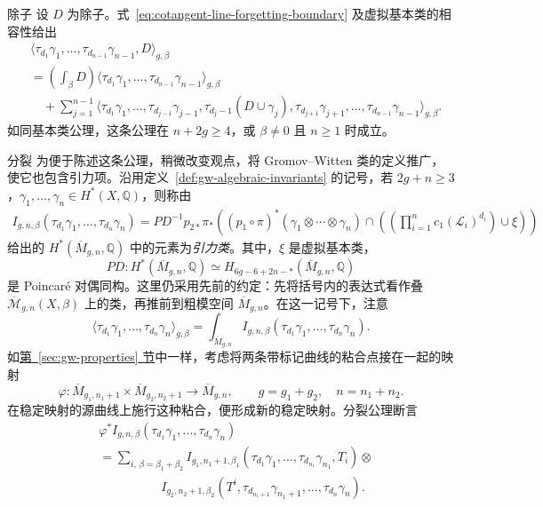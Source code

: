 \begin{axiom*}{除子}
设 $D$ 为除子。式~\eqref{eq:cotangent-line-forgetting-boundary} 及虚拟基本类的相容性给出
\[
\begin{aligned}
&\langle\tau_{d_1}\gamma_1,\ldots,\tau_{d_{n-1}}\gamma_{n-1},D\rangle_{g,\beta}\\
&=\left(\int_\beta D\right)
\langle\tau_{d_1}\gamma_1,\ldots,\tau_{d_{n-1}}\gamma_{n-1}\rangle_{g,\beta}\\
&\quad+\sum_{j=1}^{n-1}\langle\tau_{d_1}\gamma_1,\ldots,
\tau_{d_{j-1}}\gamma_{j-1},\tau_{d_j-1}(D\cup\gamma_j),
\tau_{d_{j+1}}\gamma_{j+1},\ldots,\tau_{d_{n-1}}\gamma_{n-1}\rangle_{g,\beta}.
\end{aligned}
\]
如同基本类公理，这条公理在 $n+2g\ge4$，或 $\beta\ne0$ 且 $n\ge1$ 时成立。
\end{axiom*}

\begin{axiom*}{分裂}
为便于陈述这条公理，稍微改变观点，将 Gromov--Witten 类的定义推广，使它也包含引力项。沿用定义~\ref{def:gw-algebraic-invariants} 的记号，若 $2g+n\ge3$，$\gamma_1,\ldots,\gamma_n\in H^*(X,\mathbb Q)$，则称由
\begin{equation}\label{eq:gravitational-class-definition}
\begin{aligned}
I_{g,n,\beta}(\tau_{d_1}\gamma_1,\ldots,\tau_{d_n}\gamma_n)
=PD^{-1}p_{2*}\pi_*\left((p_1\circ\pi)^*(\gamma_1\otimes\cdots\otimes\gamma_n)
\cap\left(\left(\prod_{i=1}^n c_1(\mathcal L_i)^{d_i}\right)\cup\xi\right)\right)
\end{aligned}
\end{equation}
给出的 $H^*(\overline M_{g,n},\mathbb Q)$ 中的元素为\emph{引力类}。其中，$\xi$ 是虚拟基本类，
\[
PD:H^*(\overline M_{g,n},\mathbb Q)
\simeq H_{6g-6+2n-*}(\overline M_{g,n},\mathbb Q)
\]
是 Poincaré 对偶同构。这里仍采用先前的约定：先将括号内的表达式看作叠 $\overline{\mathcal M}_{g,n}(X,\beta)$ 上的类，再推前到粗模空间 $\overline M_{g,n}$。在这一记号下，注意
\begin{equation}\label{eq:gravitational-class-integral}
\langle\tau_{d_1}\gamma_1,\ldots,\tau_{d_n}\gamma_n\rangle_{g,\beta}
=\int_{\overline M_{g,n}}I_{g,n,\beta}(\tau_{d_1}\gamma_1,\ldots,\tau_{d_n}\gamma_n).
\end{equation}
如\hyperref[sec:gw-properties]{第~\ref*{sec:gw-properties} 节}中一样，考虑将两条带标记曲线的粘合点接在一起的映射
\[
\varphi:\overline M_{g_1,n_1+1}\times\overline M_{g_2,n_2+1}
\longrightarrow\overline M_{g,n},
\qquad g=g_1+g_2,\quad n=n_1+n_2.
\]
在稳定映射的源曲线上施行这种粘合，便形成新的稳定映射。分裂公理断言
\[
\begin{aligned}
&\varphi^*I_{g,n,\beta}(\tau_{d_1}\gamma_1,\ldots,\tau_{d_n}\gamma_n)\\
&=\sum_{i,\,\beta=\beta_1+\beta_2}
I_{g_1,n_1+1,\beta_1}(\tau_{d_1}\gamma_1,\ldots,\tau_{d_{n_1}}\gamma_{n_1},T_i)\otimes\\
&\hspace{5em}I_{g_2,n_2+1,\beta_2}(T^i,\tau_{d_{n_1+1}}\gamma_{n_1+1},\ldots,\tau_{d_n}\gamma_n).
\end{aligned}
\]
\end{axiom*}

